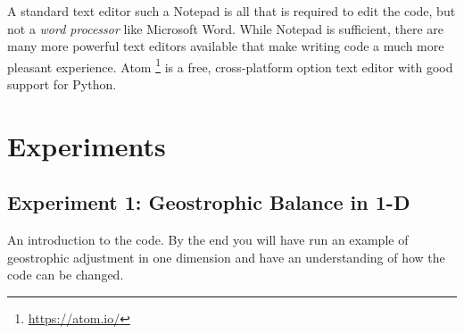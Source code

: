 \documentclass[a4paper, sfsidenotes, twoside]{tufte-handout}
\begin{document}
  A standard text editor such a Notepad is all that is required to edit the code, but not a \emph{word processor} like Microsoft Word.
  While Notepad is sufficient, there are many more powerful text editors available that make writing code a much more pleasant experience.
  Atom  \footnote{\url{https://atom.io/}} is a free, cross-platform option text editor with good support for Python.

  \section{Experiments}
  \label{sec:Experiments}

  \subsection{Experiment 1: Geostrophic Balance in 1-D}
  \label{sub:exp1}

  An introduction to the code.  By the end you will have run an example of geostrophic adjustment in one dimension and have an understanding of how the code can be changed.
\end{document}
